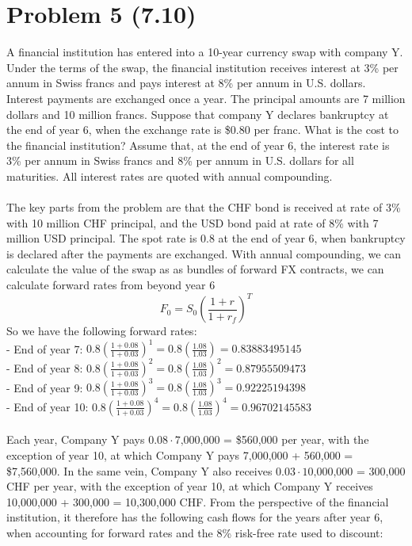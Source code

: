 \documentclass{article}
\begin{document}
{\Large 

\section*{Problem 5 (7.10)}
A financial institution has entered into a 10-year currency swap with company Y. Under the terms of the swap, the financial institution receives interest at 3\% per annum in Swiss francs and pays interest at 8\% per annum in U.S. dollars. Interest payments are exchanged once a year. The principal amounts are 7 million dollars and 10 million francs. Suppose that company Y declares bankruptcy at the end of year 6, when the exchange rate is \$0.80 per franc. What is the cost to the financial institution? Assume that, at the end of year 6, the interest rate is 3\% per annum in Swiss francs and 8\% per annum in U.S. dollars for all maturities. All interest rates are quoted with annual compounding. \\ \\
The key parts from the problem are that the CHF bond is received at rate of 3\% with 10 million CHF principal, and the USD bond paid at rate of 8\% with 7 million USD principal. The spot rate is 0.8 at the end of year 6, when bankruptcy is declared after the payments are exchanged. With annual compounding, we can calculate the value of the swap as as bundles of forward FX contracts, we can calculate forward rates from beyond year 6
\[
  F_0 = S_0(\frac{1 + r}{1 + r_f})^T
\]
So we have the following forward rates: \\
- End of year 7: \(0.8(\frac{1 + 0.08}{1 + 0.03})^1 = 0.8(\frac{1.08}{1.03}) = 0.83883495145 \) \\
- End of year 8: \(0.8(\frac{1 + 0.08}{1 + 0.03})^2 = 0.8(\frac{1.08}{1.03})^2 = 0.87955509473 \) \\
- End of year 9: \(0.8(\frac{1 + 0.08}{1 + 0.03})^3 = 0.8(\frac{1.08}{1.03})^3 = 0.92225194398 \) \\
- End of year 10: \(0.8(\frac{1 + 0.08}{1 + 0.03})^4 = 0.8(\frac{1.08}{1.03})^4 = 0.96702145583 \) \\ \\
Each year, Company Y pays \( 0.08 \cdot \text{7,000,000}\) = \$560,000 per year, with the exception of year 10, at which Company Y pays 7,000,000 + 560,000 = \$7,560,000. In the same vein, Company Y also receives \(0.03 \cdot \text{10,000,000}\) = 300,000 CHF per year, with the exception of year 10, at which Company Y receives 10,000,000 + 300,000 = 10,300,000 CHF. From the perspective of the financial institution, it therefore has the following cash flows for the years after year 6, when accounting for forward rates and the 8\% risk-free rate used to discount: \\ 
}
\end{document}
